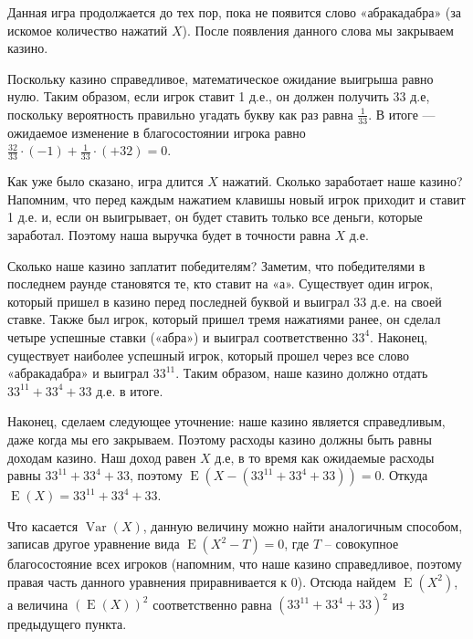 \documentclass[a4paper]{caesar_book}
\theoremstyle{definition}
\newcounter{problem}
\newenvironment{problem}%
{%
\refstepcounter{problem}%
     \hypertarget{problem:{\theproblem}}{}
     \Writetofile{solution_file}{\protect\hypertarget{soln:\theproblem}{}}
     \begin{myenum}[label=\bfseries\protect\hyperlink{soln:\theproblem}{\theproblem}, ref=\theproblem, leftmargin=0pt]
     \item%
    }%
    {%
    \end{myenum}}
\DeclareMathOperator{\Var}{Var}
\DeclareMathOperator{\E}{E}
\begin{document}
\begin{problem}
\begin{sol}
\begin{enumerate}
Данная игра продолжается до тех пор, пока не появится слово «абракадабра»
(за искомое количество нажатий $X$). После появления данного слова мы закрываем казино.

Поскольку казино справедливое, математическое ожидание выигрыша равно нулю.
Таким образом, если игрок ставит 1 д.е., он должен получить 33 д.е,
поскольку вероятность правильно угадать букву как раз равна $\frac{1}{33}$.
В итоге — ожидаемое изменение в благосостоянии игрока
равно $\frac{32}{33}\cdot(-1) + \frac{1}{33}\cdot(+32) = 0$.

Как уже было сказано, игра длится $X$ нажатий. Сколько заработает наше казино?
Напомним, что перед каждым нажатием клавишы новый игрок приходит и ставит 1 д.е.
и, если он выигрывает, он будет ставить только все деньги, которые заработал.
Поэтому наша выручка будет в точности равна $X$ д.е.

Сколько наше казино заплатит победителям? Заметим,
что победителями в последнем раунде становятся те, кто ставит на «а».
Существует один игрок, который пришел в казино перед последней буквой
и выиграл $33$ д.е. на своей ставке. Также был игрок,
который пришел тремя нажатиями ранее, он сделал четыре успешные ставки («абра»)
и выиграл соответственно $33^4$. Наконец, существует наиболее успешный игрок,
который прошел через все слово «абракадабра» и выиграл $33^{11}$.
Таким образом, наше казино должно отдать $33^{11}+33^4+33$ д.е. в итоге.

Наконец, сделаем следующее уточнение: наше казино является справедливым,
даже когда мы его закрываем. Поэтому расходы казино должны быть равны доходам казино.
Наш доход равен $X$ д.е, в то время как ожидаемые расходы равны $33^{11}+33^4+33$,
поэтому $\E (X - (33^{11}+33^4+33)) = 0$. Откуда $\E(X) = 33^{11}+33^4+33$.

Что касается $\Var(X)$, данную величину можно найти аналогичным способом,
записав другое уравнение вида $\E(X^2 - T)=0$, где $T$ – совокупное
благосостояние всех игроков (напомним, что наше казино справедливое,
поэтому правая часть данного уравнения приравнивается к $0$).
Отсюда найдем $\E(X^2)$, а величина $(\E(X))^2$
соответственно равна $(33^{11}+33^4+33)^2$ из предыдущего пункта.
\end{enumerate}
\end{sol}

\end{problem}
\end{document}
